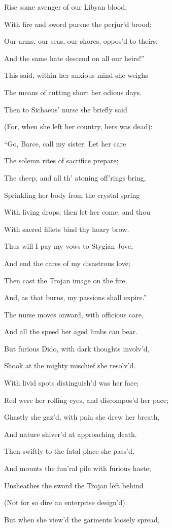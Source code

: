 Rise some avenger of our Libyan blood,

With fire and sword pursue the perjur’d brood;

Our arms, our seas, our shores, oppos’d to theirs;

And the same hate descend on all our heirs!”

This said, within her anxious mind she weighs

The means of cutting short her odious days.

Then to Sichaeus’ nurse she briefly said

(For, when she left her country, hers was dead):

“Go, Barce, call my sister. Let her care

The solemn rites of sacrifice prepare;

The sheep, and all th’ atoning off’rings bring,

Sprinkling her body from the crystal spring

With living drops; then let her come, and thou

With sacred fillets bind thy hoary brow.

Thus will I pay my vows to Stygian Jove,

And end the cares of my disastrous love;

Then cast the Trojan image on the fire,

And, as that burns, my passions shall expire.”

The nurse moves onward, with officious care,

And all the speed her aged limbs can bear.

But furious Dido, with dark thoughts involv’d,

Shook at the mighty mischief she resolv’d.

With livid spots distinguish’d was her face;

Red were her rolling eyes, and discompos’d her pace;

Ghastly she gaz’d, with pain she drew her breath,

And nature shiver’d at approaching death.

Then swiftly to the fatal place she pass’d,

And mounts the fun’ral pile with furious haste;

Unsheathes the sword the Trojan left behind

(Not for so dire an enterprise design’d).

But when she view’d the garments loosely spread,

